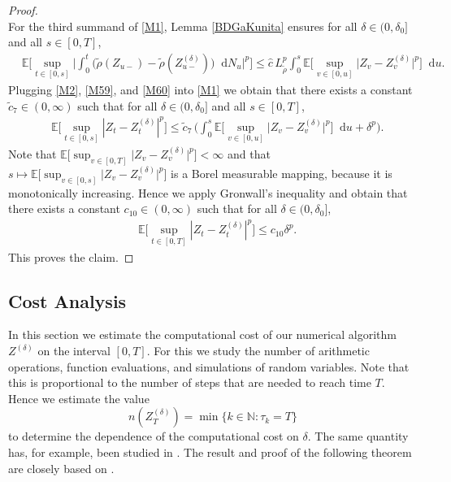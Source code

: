 \documentclass[11pt,a4paper]{article}
\numberwithin{equation}{section}
\theoremstyle{definition}
\newcommand{\E}{{\mathbb{E}}}
\newcommand{\N}{{\mathbb{N}}}
\newcommand{\diff}{\mathop{}\!\mathrm{d}}
\begin{document}
\begin{proof}
\begin{equation}
\end{equation}
For the third summand of \eqref{M1}, Lemma \ref{BDGaKunita} ensures for all $\delta\in(0,\delta_0]$ and all $s\in[0,T]$,
\begin{equation}\label{M60}
    \begin{aligned}
    &\E\Big[\sup_{t\in[0,s]} \Big| \int_0^t \big(\widetilde\rho(Z_{u-}) -\widetilde\rho(Z^{(\delta)}_{u-}) \big) \diff N_u\Big|^p\Big]
    \leq \hat c\, L_{\widetilde\rho}^p  \int_0^s \E\Big[ \sup_{v\in[0,u]} \big| Z_{v} - Z^{(\delta)}_{v} \big|^p\Big] \diff u.
    \end{aligned}
\end{equation}
Plugging \eqref{M2}, \eqref{M59}, and \eqref{M60} into  \eqref{M1} we obtain that there exists a constant $\widetilde c_{7}\in(0, \infty)$ such that for all $\delta\in(0,\delta_0]$ and all $s\in[0,T]$,
\begin{equation}\label{M61}
    \begin{aligned}
    &\E\Big[\sup_{t\in[0,s]}|Z_t - Z_t^{(\delta)}|^p\Big]
    \leq \widetilde c_{7}\, \Big(\int_0^s \E\Big[ \sup_{v\in[0,u]} \big| Z_{v} - Z^{(\delta)}_{v} \big|^p\Big] \diff u + \delta^{p}\Big). 
    \end{aligned}
\end{equation}
Note that $\E\Big[\sup_{v\in[0,T]} \big| Z_{v} - Z^{(\delta)}_{v} \big|^p\Big]<\infty$ and that $s\mapsto \E\Big[\sup_{v\in[0,s]} \big| Z_{v} - Z^{(\delta)}_{v} \big|^p\Big]$ is a Borel measurable mapping, because it is monotonically increasing. Hence we apply Gronwall's inequality and obtain that there exists a constant $c_{10}\in(0,\infty)$ such that for all $\delta\in(0,\delta_0]$,
\begin{equation}\label{M62}
    \begin{aligned}
    &\E\Big[\sup_{t\in[0,T]}|Z_t - Z_t^{(\delta)}|^p\Big]
    \leq c_{10}  \delta^{p}.
    \end{aligned}
\end{equation}
This proves the claim.
\end{proof}

\subsection{Cost Analysis}

In this section we estimate the computational cost of our numerical algorithm $Z^{(\delta)}$ on the interval $[0,T]$. For this we study the number of arithmetic operations, function evaluations, and simulations of random variables. Note that this is proportional to the number of steps that are needed to reach time $T$. Hence we estimate the value
\begin{equation}
    n(Z^{(\delta)}_T) = \min\{k\in\N : \tau_k = T\}
\end{equation}
to determine the dependence of the computational cost on $\delta$. The same quantity has, for example, been studied in \cite{NSS19, Yaroslavtseva2022}. The result and proof of the following theorem are closely based on \cite[Section 5.5]{Yaroslavtseva2022}.
\end{document}
